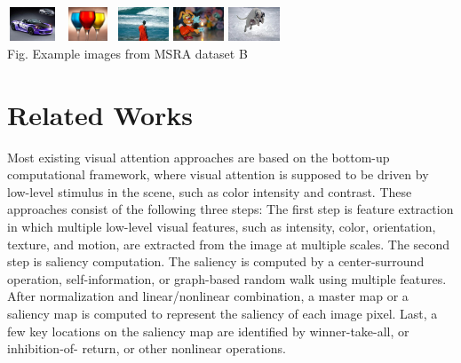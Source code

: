 \documentclass[10pt,twocolumn,letterpaper]{article}
\begin{document}
\begin{center}
    \includegraphics[width=0.6in,height=0.4in]{./Figures/example_image/4_142_142916.jpg}
    \includegraphics[width=0.6in,height=0.4in]{./Figures/example_image/4_143_143262.jpg}
    \includegraphics[width=0.6in,height=0.4in]{./Figures/example_image/4_144_144604.jpg}
    \includegraphics[width=0.6in,height=0.4in]{./Figures/example_image/4_134_134777.jpg}
    \includegraphics[width=0.6in,height=0.4in]{./Figures/example_image/4_134_134664.jpg}\\
    \footnotesize Fig. Example images from MSRA dataset B
    \end{center}

\section{Related Works}
Most existing visual attention approaches are based on the bottom-up computational framework,
where visual attention is supposed to be driven by low-level stimulus in the scene,
such as color intensity and contrast. These approaches consist of the following three steps:
The first step is feature extraction in which multiple low-level visual features, such as
intensity, color, orientation, texture, and motion, are extracted from the image at multiple
scales. The second step is saliency computation. The saliency is computed by a center-surround
operation, self-information, or graph-based random walk using multiple features. After
normalization and linear/nonlinear combination, a master map or a saliency map is computed
to represent the saliency of each image pixel. Last, a few key locations on the saliency map
are identified by winner-take-all, or inhibition-of- return, or other nonlinear operations.
\end{document}
